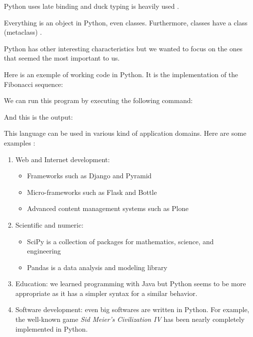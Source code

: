 Python uses late binding \cite{python_pep0289} and duck typing is heavily used \cite{wikipediaEN_duck_typing_python}.

Everything is an object in Python, even classes. Furthermore, classes have a class (metaclass) \cite{python_doc_datamodel}.

Python has other interesting characteristics but we wanted to focus on the ones that seemed the most important to us.
\newline

Here is an exemple of working code in Python. It is the implementation of the Fibonacci sequence:


We can run this program by executing the following command:


And this is the output:


This language can be used in various kind of application domains. Here are some examples \cite{python_applications}:
\begin{enumerate}
    \item {Web and Internet development:
        \begin{itemize}
            \item Frameworks such as Django and Pyramid
            \item Micro-frameworks such as Flask and Bottle
            \item Advanced content management systems such as Plone
        \end{itemize}
    }
    \item {Scientific and numeric:
        \begin{itemize}
            \item SciPy is a collection of packages for mathematics, science, and engineering
            \item Pandas is a data analysis and modeling library
        \end{itemize}
    
    }
    \item Education: we learned programming with Java but Python seems to be more appropriate as it has a simpler syntax for a similar behavior.
    \item Software development: even big softwares are written in Python. For example, the well-known game \emph{Sid Meier's Civilization IV} has been nearly completely implemented in Python.
\end{enumerate}
